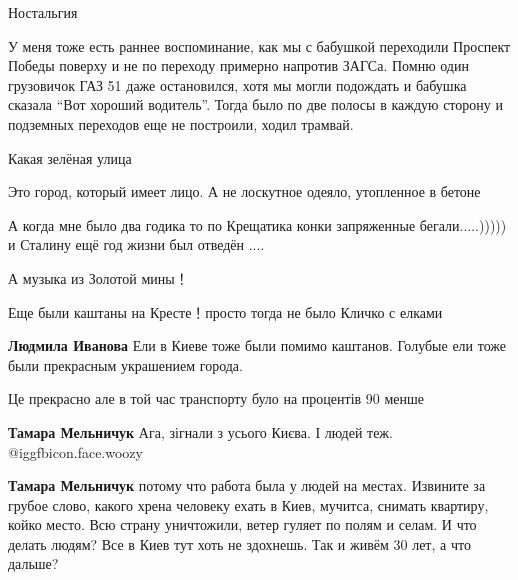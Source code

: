 \begin{itemize}
Ностальгия


У меня тоже есть раннее воспоминание, как мы с бабушкой переходили Проспект
Победы поверху и не по переходу примерно напротив ЗАГСа. Помню один грузовичок
ГАЗ 51 даже остановился, хотя мы могли подождать и бабушка сказала \enquote{Вот хороший
водитель}. Тогда было по две полосы в каждую сторону и подземных переходов еще
не построили, ходил трамвай.


Какая зелёная улица

Это город, который имеет лицо. А не лоскутное одеяло, утопленное в бетоне

А когда мне было два годика то по Крещатика конки запряженные бегали.....)))))
и Сталину ещё год жизни был отведён ....

А музыка из Золотой мины！

Еще были каштаны на Кресте！просто тогда не было Кличко с елками

\begin{itemize} %
\textbf{Людмила Иванова} Ели в Киеве тоже были помимо каштанов. Голубые ели тоже были прекрасным украшением города.
\end{itemize} %

Це прекрасно але в той час транспорту було на процентів 90 менше

\begin{itemize} %
\textbf{Тамара Мельничук} Ага, зігнали з усього Києва. І людей теж.  @igg{fbicon.face.woozy} 

\textbf{Тамара Мельничук} потому что работа была у людей на местах. Извините за грубое слово, какого хрена человеку ехать в Киев, мучитса, снимать квартиру, койко место. Всю страну уничтожили, ветер гуляет по полям и селам. И что делать людям? Все в Киев тут хоть не здохнешь. Так и живём 30 лет, а что дальше?
\end{itemize} %

\end{itemize} %
